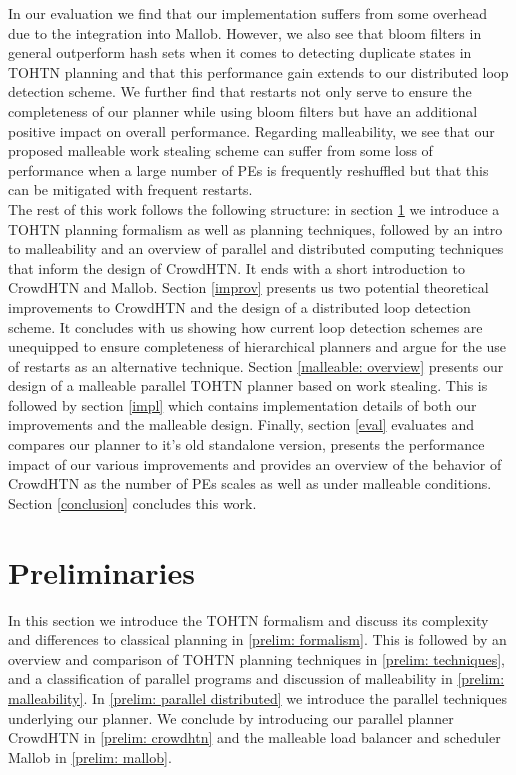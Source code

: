 \documentclass[enabledeprecatedfontcommands,12pt,a4paper,twoside]{scrartcl}
\numberwithin{equation}{section}
\begin{document}
In our evaluation we find that our implementation suffers from some overhead due to the integration into Mallob.
However, we also see that bloom filters in general outperform hash sets when it comes to detecting duplicate states in TOHTN planning and that this performance gain extends to our distributed loop detection scheme. We further find that restarts not only serve to ensure the completeness of our planner while using bloom filters but have an additional positive impact on overall performance. Regarding malleability, we see that our proposed malleable work stealing scheme can suffer from some loss of performance when a large number of PEs is frequently reshuffled but that this can be mitigated with frequent restarts. \\

The rest of this work follows the following structure: in section \ref{prelim} we introduce a TOHTN planning formalism as well as planning techniques, followed by an intro to malleability and an overview of parallel and distributed computing techniques that inform the design of CrowdHTN. It ends with a short introduction to CrowdHTN and Mallob. Section \ref{improv} presents us two potential theoretical improvements to CrowdHTN and the design of a distributed loop detection scheme. It concludes with us showing how current loop detection schemes are unequipped to ensure completeness of hierarchical planners and argue for the use of restarts as an alternative technique. Section \ref{malleable: overview} presents our design of a malleable parallel TOHTN planner based on work stealing. This is followed by section \ref{impl} which contains implementation details of both our improvements and the malleable design. Finally, section \ref{eval} evaluates and compares our planner to it's old standalone version, presents the performance impact of our various improvements and provides an overview of the behavior of CrowdHTN as the number of PEs scales as well as under malleable conditions. Section \ref{conclusion} concludes this work.
	
\clearpage
\pagebreak
\section{Preliminaries}
\label{prelim}
In this section we introduce the TOHTN formalism and discuss its complexity and differences to classical planning in \ref{prelim: formalism}. This is followed by an overview and comparison of TOHTN planning techniques in \ref{prelim: techniques}, and a classification of parallel programs and discussion of malleability in \ref{prelim: malleability}. In \ref{prelim: parallel distributed} we introduce the parallel techniques underlying our planner. We conclude by introducing our parallel planner CrowdHTN in \ref{prelim: crowdhtn} and the malleable load balancer and scheduler Mallob in \ref{prelim: mallob}.






\end{document}
